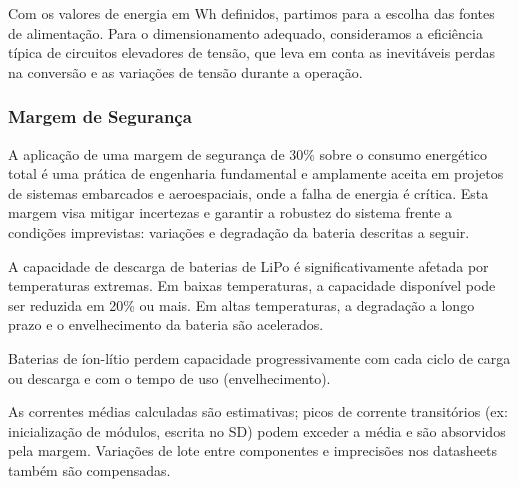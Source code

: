 Com os valores de energia em Wh definidos, partimos para a escolha das fontes de alimentação. Para o dimensionamento adequado, consideramos a eficiência típica de circuitos elevadores de tensão, que leva em conta as inevitáveis perdas na conversão e as variações de tensão durante a operação.


\subsubsection{Margem de Segurança}

A aplicação de uma margem de segurança de 30\% sobre o consumo energético total é uma prática de engenharia fundamental e amplamente aceita em projetos de sistemas embarcados e aeroespaciais, onde a falha de energia é crítica. Esta margem visa mitigar incertezas e garantir a robustez do sistema frente a condições imprevistas: variações e degradação da bateria descritas a seguir.

A capacidade de descarga de baterias de LiPo é significativamente afetada por temperaturas extremas. Em baixas temperaturas, a capacidade disponível pode ser reduzida em 20\% ou mais. Em altas temperaturas, a degradação a longo prazo e o envelhecimento da bateria são acelerados.\cite{plett2015}

Baterias de íon-lítio perdem capacidade progressivamente com cada ciclo de carga ou descarga e com o tempo de uso (envelhecimento). 

As correntes médias calculadas são estimativas; picos de corrente transitórios (ex: inicialização de módulos, escrita no SD) podem exceder a média e são absorvidos pela margem. Variações de lote entre componentes e imprecisões nos datasheets também são compensadas. 

